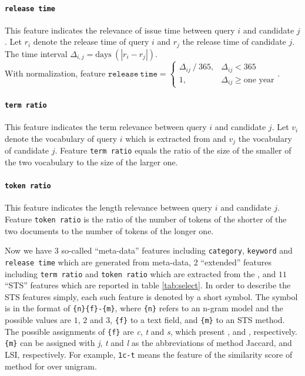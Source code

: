 \paragraph{\texttt{release time}} 

This feature indicates the relevance of issue time between query $i$ and candidate $j$. Let $r_i$ denote the release time of query $i$ and $r_j$ the release time of candidate $j$. The time interval $\Delta_{i,j}=\text{days}~(|r_i - r_j|)$. \\ With normalization, feature $\mathtt{release~time} = \begin{cases} \Delta_{ij}~/~365, & \Delta_{ij} < 365 \\ 1, & \Delta_{ij} \ge \text{one year} \end{cases}$. 

\paragraph{\texttt{term ratio}} 

This feature indicates the term relevance between query $i$ and candidate $j$. Let $v_i$ denote the vocabulary of query $i$ which is extracted from \icontent{} and $v_j$ the vocabulary of candidate $j$. Feature \texttt{term ratio} equals the ratio of the size of the smaller of the two vocabulary to the size of the larger one. 

\paragraph{\texttt{token ratio}} This feature indicates the length relevance between query $i$ and candidate $j$. Feature \texttt{token ratio} is the ratio of the number of tokens of the shorter of the two \icontent{} documents to the number of tokens of the longer one. 

Now we have $3$ so-called ``meta-data'' features including \texttt{category}, \texttt{keyword} and \texttt{release time} which are generated from meta-data, $2$ ``extended'' features including \texttt{term ratio} and \texttt{token ratio} which are extracted from the \icontent{}, and $11$ ``STS'' features which are reported in table \ref{tab:select}. In order to describe the STS features simply, each such feature is denoted by a short symbol. The symbol is in the format of \texttt{\{n\}\{f\}-\{m\}}, where \texttt{\{n\}} refers to an n-gram model and the possible values are $1$, $2$ and $3$, \texttt{\{f\}} to a text field, and \texttt{\{m\}} to an STS method. The possible assignments of \texttt{\{f\}} are \textit{c}, \textit{t} and \textit{s}, which present \icontent{}, \ititle{} and \isummary{}, respectively. \texttt{\{m\}} can be assigned with \textit{j}, \textit{t} and \textit{l} as the abbreviations of method Jaccard, \tfidf{} and LSI, respectively. For example, \texttt{1c-t} means the feature of the similarity score of method \tfidf{} for \icontent{} over unigram.


